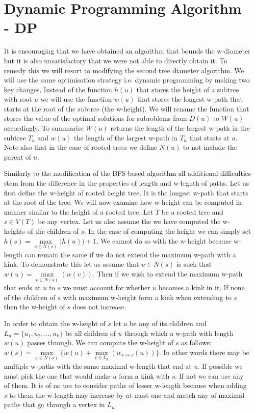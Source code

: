 \section{Dynamic Programming Algorithm - DP}

It is encouraging that we have obtained an algorithm that bounds the w-diameter but it is also unsatisfactory that we were not able to directly obtain it. To remedy this we will resort to modifying the second tree diameter algorithm. We will use the same optimisation strategy i.e. dynamic programming by making two key changes. Instead of the function $h(u)$ that stores the height of a subtree with root $u$ we will use the function $w(u)$ that stores the longest w-path that starts at the root of the subtree (the w-height). We will rename the function that stores the value of the optimal solutions for subroblems from $D(u)$ to $W(u)$ accordingly. To summarise $W(u)$ returns the length of the largest w-path in the subtree $T_u$ and $w(u)$ the length of the largest w-path in $T_u$ that starts at $u$. Note also that in the case of rooted trees we define $N(u)$ to not include the parent of $u$.

Similarly to the modification of the BFS based algorithm all additional difficulties stem from the difference in the properties of length and w-legnth of paths. Let us first define the w-height of rooted height tree. It is the longest w-path that starts at the root of the tree. We will now examine how w-height can be computed in manner similar to the height of a rooted tree. Let $T$ be a rooted tree and $s \in V(T)$ be any vertex. Let us also assume the we have computed the w-heights of the children of $s$. In the case of computing the height we can simply set $h(s) = \max\limits_{u \in N(s)}\big( h(u) \big) + 1$. We cannot do so with the w-height because w-length can remain the same if we do not extend the maximum w-path with a kink.  To demonstrate this let us assume that $u \in N(s)$ is such that $w(u) = \max\limits_{v \in N(s)}(w(v))$. Then if we wish to extend the maximum w-path that ends at $u$ to $s$ we must account for whether $u$ becomes a kink in it. If none of the children of $s$ with maximum w-height form a kink when extending to $s$ then the w-height of $s$ does not increase.

In order to obtain the w-height of $s$ let $u$ be any of its children and $L_u = \{u_1, u_2, ..., u_k\}$ be all children of $u$ through which a w-path with length $w(u)$ passes through. We can compute the w-height of $s$ as follows: $w(s) = \max\limits_{u \in N(s)}\{ w(u) + \max\limits_{v \in L_u}(w_{s \rightsquigarrow v}(u)) \}$. In other words there may be multiple w-paths with the same maximal w-length that end at $u$. If possible we must pick the one that would make $u$ form a kink with $s$. If not we can use any of them. It is of no use to consider paths of lesser w-length because when adding $s$ to them the w-length may increase by at most one and match any of maximal paths that go through a vertex in $L_u$.

